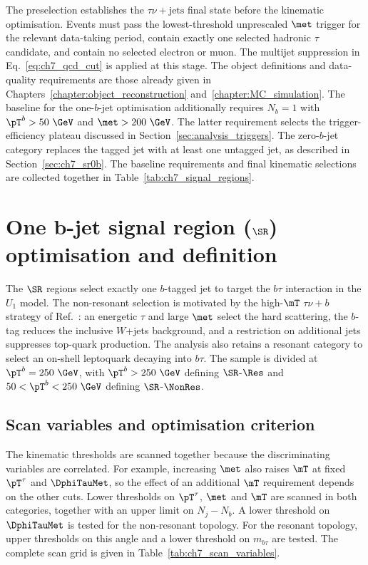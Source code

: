 The preselection establishes the $\tau\nu+\mathrm{jets}$ final state before the kinematic optimisation.
Events must pass the lowest-threshold unprescaled $\met$ trigger for the relevant data-taking period, contain exactly one selected hadronic $\tau$ candidate, and contain no selected electron or muon.
The multijet suppression in Eq.~\ref{eq:ch7_qcd_cut} is applied at this stage.
The object definitions and data-quality requirements are those already given in Chapters~\ref{chapter:object_reconstruction} and~\ref{chapter:MC_simulation}.
The baseline for the one-$b$-jet optimisation additionally requires $N_b=1$ with $\pT^b>50~\GeV$ and $\met>200~\GeV$.
The latter requirement selects the trigger-efficiency plateau discussed in Section~\ref{sec:analysis_triggers}.
The zero-$b$-jet category replaces the tagged jet with at least one untagged jet, as described in Section~\ref{sec:ch7_sr0b}.
The baseline requirements and final kinematic selections are collected together in Table~\ref{tab:ch7_signal_regions}.

\section[One b-jet signal region (SR1b) optimisation and definition]{One b-jet signal region ($\SR$) optimisation and definition}
\label{sec:ch7_sr1b}

The $\SR$ regions select exactly one $b$-tagged jet to target the $b\tau$ interaction in the $U_1$ model.
The non-resonant selection is motivated by the high-$\mT$ $\tau\nu+b$ strategy of Ref.~\cite{Endo2022NonResonant}: an energetic $\tau$ and large $\met$ select the hard scattering, the $b$-tag reduces the inclusive $W$+jets background, and a restriction on additional jets suppresses top-quark production.
The analysis also retains a resonant category to select an on-shell leptoquark decaying into $b\tau$.
The sample is divided at $\pT^b=250~\GeV$, with $\pT^b>250~\GeV$ defining $\SR$-$\Res$ and $50<\pT^b<250~\GeV$ defining $\SR$-$\NonRes$.

\subsection{Scan variables and optimisation criterion}
\label{subsec:ch7_scan}

The kinematic thresholds are scanned together because the discriminating variables are correlated.
For example, increasing $\met$ also raises $\mT$ at fixed $\pT^\tau$ and $\DphiTauMet$, so the effect of an additional $\mT$ requirement depends on the other cuts.
Lower thresholds on $\pT^\tau$, $\met$ and $\mT$ are scanned in both categories, together with an upper limit on $N_j-N_b$.
A lower threshold on $\DphiTauMet$ is tested for the non-resonant topology.
For the resonant topology, upper thresholds on this angle and a lower threshold on $m_{b\tau}$ are tested.
The complete scan grid is given in Table~\ref{tab:ch7_scan_variables}.

